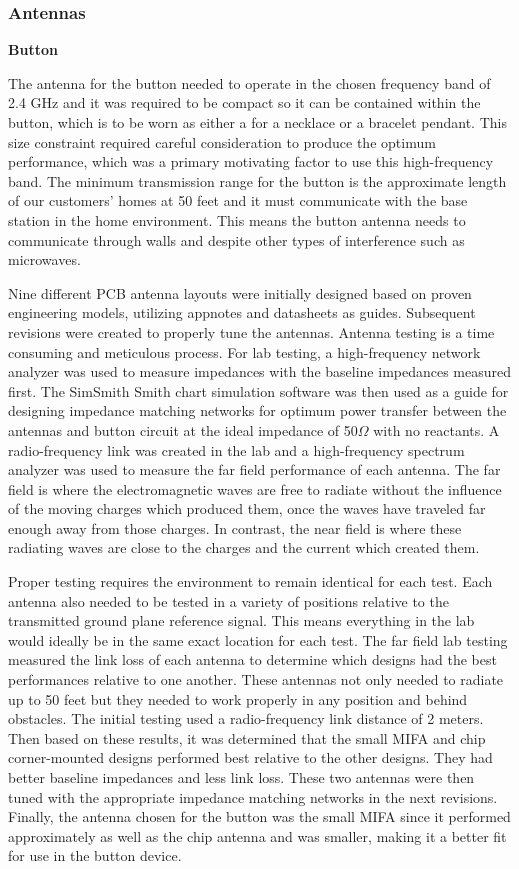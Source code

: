 \documentclass[journal,compsoc]{IEEEtran}
\begin{document}
\subsubsection {Antennas}

\textbf {Button}

The antenna for the button needed to operate in the chosen frequency band of 2.4 GHz and it was required to be compact so it can be contained within the button, which is to be worn as either a for a necklace or a bracelet pendant.  This size constraint required careful consideration to produce the optimum performance, which was a primary motivating factor to use this high-frequency band.  The minimum transmission range for the button is the approximate length of our customers’ homes at 50 feet and it must communicate with the base station in the home environment.  This means the button antenna needs to communicate through walls and despite other types of interference such as microwaves.

Nine different PCB antenna layouts were initially designed based on proven engineering models, utilizing appnotes and datasheets as guides.  Subsequent revisions were created to properly tune the antennas.  Antenna testing is a time consuming and meticulous process.  For lab testing, a high-frequency network analyzer was used to measure impedances with the baseline impedances measured first.  The SimSmith Smith chart simulation software was then used as a guide for designing impedance matching networks for optimum power transfer between the antennas and button circuit at the ideal impedance of 50$\Omega$ with no reactants.  A radio-frequency link was created in the lab and a high-frequency spectrum analyzer was used to measure the far field performance of each antenna.  The far field is where the electromagnetic waves are free to radiate without the influence of the moving charges which produced them, once the waves have traveled far enough away from those charges.  In contrast, the near field is where these radiating waves are close to the charges and the current which created them.

Proper testing requires the environment to remain identical for each test.  Each antenna also needed to be tested in a variety of positions relative to the transmitted ground plane reference signal.  This means everything in the lab would ideally be in the same exact location for each test.  The far field lab testing measured the link loss of each antenna to determine which designs had the best performances relative to one another.   These antennas not only needed to radiate up to 50 feet but they needed to work properly in any position and behind obstacles.  The initial testing used a radio-frequency link distance of 2 meters.  Then based on these results, it was determined that the small MIFA and chip corner-mounted designs performed best relative to the other designs.  They had better baseline impedances and less link loss.  These two antennas were then tuned with the appropriate impedance matching networks in the next revisions.  Finally, the antenna chosen for the button was the small MIFA since it performed approximately as well as the chip antenna and was smaller, making it a better fit for use in the button device.
\end{document}
